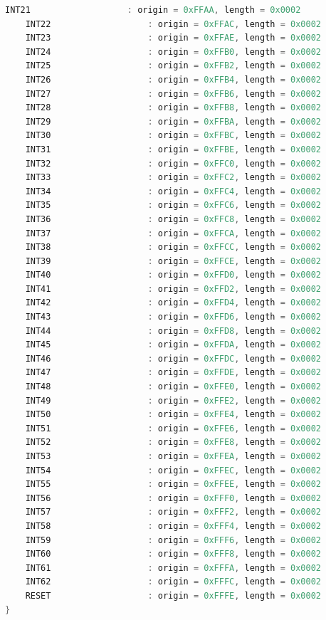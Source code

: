 \documentclass[LaM,binding=0.6cm]{../sapthesis}
\begin{document}
\begin{lstlisting}[language=C]
    INT21                   : origin = 0xFFAA, length = 0x0002
    INT22                   : origin = 0xFFAC, length = 0x0002
    INT23                   : origin = 0xFFAE, length = 0x0002
    INT24                   : origin = 0xFFB0, length = 0x0002
    INT25                   : origin = 0xFFB2, length = 0x0002
    INT26                   : origin = 0xFFB4, length = 0x0002
    INT27                   : origin = 0xFFB6, length = 0x0002
    INT28                   : origin = 0xFFB8, length = 0x0002
    INT29                   : origin = 0xFFBA, length = 0x0002
    INT30                   : origin = 0xFFBC, length = 0x0002
    INT31                   : origin = 0xFFBE, length = 0x0002
    INT32                   : origin = 0xFFC0, length = 0x0002
    INT33                   : origin = 0xFFC2, length = 0x0002
    INT34                   : origin = 0xFFC4, length = 0x0002
    INT35                   : origin = 0xFFC6, length = 0x0002
    INT36                   : origin = 0xFFC8, length = 0x0002
    INT37                   : origin = 0xFFCA, length = 0x0002
    INT38                   : origin = 0xFFCC, length = 0x0002
    INT39                   : origin = 0xFFCE, length = 0x0002
    INT40                   : origin = 0xFFD0, length = 0x0002
    INT41                   : origin = 0xFFD2, length = 0x0002
    INT42                   : origin = 0xFFD4, length = 0x0002
    INT43                   : origin = 0xFFD6, length = 0x0002
    INT44                   : origin = 0xFFD8, length = 0x0002
    INT45                   : origin = 0xFFDA, length = 0x0002
    INT46                   : origin = 0xFFDC, length = 0x0002
    INT47                   : origin = 0xFFDE, length = 0x0002
    INT48                   : origin = 0xFFE0, length = 0x0002
    INT49                   : origin = 0xFFE2, length = 0x0002
    INT50                   : origin = 0xFFE4, length = 0x0002
    INT51                   : origin = 0xFFE6, length = 0x0002
    INT52                   : origin = 0xFFE8, length = 0x0002
    INT53                   : origin = 0xFFEA, length = 0x0002
    INT54                   : origin = 0xFFEC, length = 0x0002
    INT55                   : origin = 0xFFEE, length = 0x0002
    INT56                   : origin = 0xFFF0, length = 0x0002
    INT57                   : origin = 0xFFF2, length = 0x0002
    INT58                   : origin = 0xFFF4, length = 0x0002
    INT59                   : origin = 0xFFF6, length = 0x0002
    INT60                   : origin = 0xFFF8, length = 0x0002
    INT61                   : origin = 0xFFFA, length = 0x0002
    INT62                   : origin = 0xFFFC, length = 0x0002
    RESET                   : origin = 0xFFFE, length = 0x0002
}


\end{lstlisting}
\end{document}
